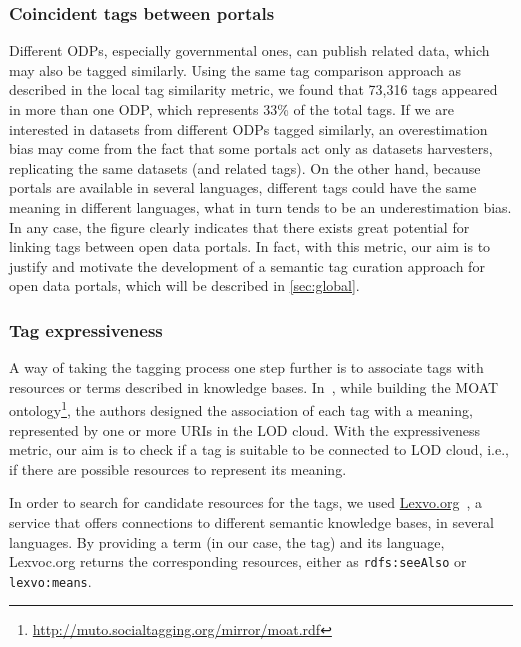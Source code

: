\documentclass[conference]{IEEEtran}
\begin{document}
\subsubsection{Coincident tags between portals}
Different ODPs, especially governmental ones, can publish related data, which may also be tagged similarly. %
Using the same tag comparison approach as described in the local tag similarity metric, we found that 73,316 tags appeared in more than one ODP, which represents 33\% of the total tags. 
If we are interested in datasets from different ODPs tagged similarly, an overestimation bias may come from the fact that some portals act only as datasets harvesters, replicating the same datasets (and related tags). 
On the other hand, because portals are available in several languages, different tags could have the same meaning in different languages, what in turn tends to be an underestimation bias.
In any case, the figure clearly indicates that there exists great potential for linking tags between open data portals.
In fact, with this metric, our aim is to justify and motivate the development of a semantic tag curation approach for open data portals, which will be described in \ref{sec:global}. 

\subsubsection{Tag expressiveness}
A way of taking the tagging process one step further is to associate tags with resources or terms described in knowledge bases.
In~\cite{Passant2008}, while building the MOAT ontology\footnote{\url{http://muto.socialtagging.org/mirror/moat.rdf}}, the authors designed the association of each tag with a meaning, represented by one or more URIs in the LOD cloud.
With the expressiveness metric, our aim is to check if a tag is suitable to be connected to LOD cloud, i.e., if there are possible resources to represent its meaning.

In order to search for candidate resources for the tags, we used \url{Lexvo.org}~\cite{Melo2013}, a service that offers connections to different semantic knowledge bases, in several languages.
By providing a term (in our case, the tag) and its language, Lexvoc.org returns the corresponding resources, either as \texttt{rdfs:seeAlso} or \texttt{lexvo:means}.
\end{document}
